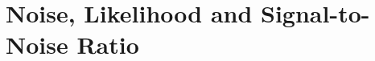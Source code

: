 \section{Noise, Likelihood and Signal-to-Noise Ratio}
\label{app:noise}\label{app:noise-psd}\label{app:noise-likelihood}\label{app:noise-snr}\label{app:noise-validation}

